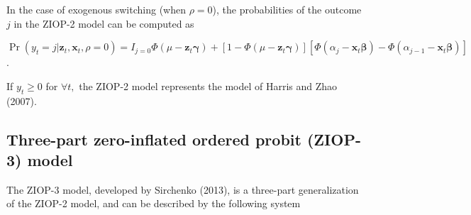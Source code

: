 \documentclass[letterpaper,fleqn,12pt]{article}
\begin{document}
\begin{onehalfspace}
In the case of exogenous switching (when $\rho =0$), the probabilities of
the outcome $j$ in the ZIOP-2 model can be computed as

\begin{center}
$\Pr (y_{t}=j|\mathbf{z}_{t},\mathbf{x}_{t},\rho =0)=I_{j=0}\Phi (\mu -%
\mathbf{z}_{t}\mathbf{\gamma })+[1-\Phi (\mu -\mathbf{z}_{t}\mathbf{\gamma }%
)][\Phi (\alpha _{j}-\mathbf{x}_{t}\mathbf{\beta })-\Phi (\alpha _{j-1}-%
\mathbf{x}_{t}\mathbf{\beta })]$.
\end{center}

If $y_{t}\geq 0$ for $\forall t,$ the ZIOP-2 model represents the model of
Harris and Zhao (2007).

\subsection{Three-part zero-inflated ordered probit (ZIOP-3) model}

The ZIOP-3 model, developed by Sirchenko (2013), is a three-part
generalization of the ZIOP-2 model, and can be described by the following
system

\medskip


\end{onehalfspace}
\end{document}
